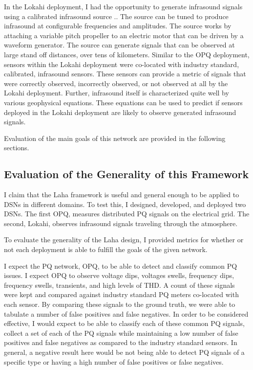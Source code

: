 In the Lokahi deployment, I had the opportunity to generate infrasound signals using a calibrated infrasound source \cite{park2009rotary}.. The source can be tuned to produce infrasound at configurable frequencies and amplitudes. The source works by attaching a variable pitch propeller to an electric motor that can be driven by a waveform generator. The source can generate signals that can be observed at large stand off distances, over tens of kilometers. Similar to the OPQ deployment, sensors within the Lokahi deployment were co-located with industry standard, calibrated, infrasound sensors. These sensors can provide a metric of signals that were correctly observed, incorrectly observed, or not observed at all by the Lokahi deployment. Further, infrasound itself is characterized quite well by various geophysical equations. These equations can be used to predict if sensors deployed in the Lokahi deployment are likely to observe generated infrasound signals.

Evaluation of the main goals of this network are provided in the following sections.

\subsection{Evaluation of the Generality of this Framework}\label{subsec:evaluation-of-the-generality-of-this-framework}
I claim that the Laha framework is useful and general enough to be applied to DSNs in different domains. To test this, I designed, developed, and deployed two DSNs. The first OPQ, measures distributed PQ signals on the electrical grid. The second, Lokahi, observes infrasound signals traveling through the atmosphere.

To evaluate the generality of the Laha design, I provided metrics for whether or not each deployment is able to fulfill the goals of the given network.

I expect the PQ network, OPQ, to be able to detect and classify common PQ issues. I expect OPQ to observe voltage dips, voltages swells, frequency dips, frequency swells, transients, and high levels of THD. A count of these signals were kept and compared against industry standard PQ meters co-located with each sensor. By comparing these signals to the ground truth, we were able to tabulate a number of false positives and false negatives. In order to be considered effective, I would expect to be able to classify each of these common PQ signals, collect a set of each of the PQ signals while maintaining a low number of false positives and false negatives as compared to the industry standard sensors. In general, a negative result here would be not being able to detect PQ signals of a specific type or having a high number of false positives or false negatives.

